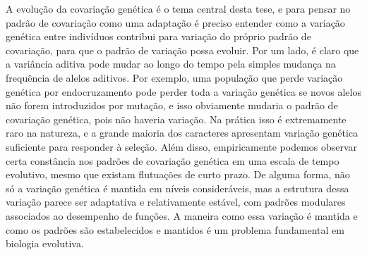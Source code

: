 \begin{refsection}
A evolução da covariação genética é o tema central desta tese, e para pensar no
padrão de covariação como uma adaptação é preciso entender como a variação
genética entre indivíduos contribui para variação do próprio padrão de
covariação, para que o padrão de variação possa evoluir. Por um lado, é claro
que a variância aditiva pode mudar ao longo do tempo pela simples mudança na
frequência de alelos aditivos. Por exemplo, uma população que perde variação
genética por endocruzamento pode  perder toda a variação genética se novos
alelos não forem introduzidos por mutação, e isso obviamente mudaria o padrão
de covariação genética, pois não haveria variação. Na prática isso é
extremamente raro na natureza, e a grande maioria dos caracteres apresentam
variação genética suficiente para responder à seleção. Além disso,
empiricamente podemos observar certa constância nos padrões de covariação
genética em uma escala de tempo evolutivo, mesmo que existam flutuações de
curto prazo. De alguma forma, não só a variação genética é mantida em níveis
consideráveis, mas a estrutura dessa variação parece ser adaptativa e
relativamente estável, com padrões modulares associados ao desempenho de
funções. A maneira como essa variação é mantida e como os padrões são estabelecidos e
mantidos é um problema fundamental em biologia evolutiva.


\end{refsection}

